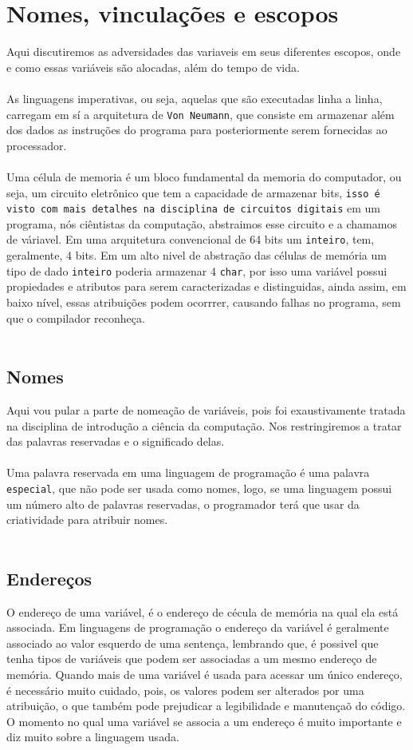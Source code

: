 \documentclass[12pt, onecolumn]{article}
\begin{document}
	\section{Nomes, vinculações e escopos}
	Aqui discutiremos as adversidades das variaveis em seus diferentes escopos, 
	onde e como essas variáveis são alocadas, além do tempo de vida.\\
	\\
	As linguagens imperativas, ou seja, aquelas que são executadas linha a linha,
	carregam em sí a arquitetura de \texttt{Von Neumann}, que consiste em 
	armazenar além dos dados as instruções do programa para posteriormente 
	serem fornecidas ao processador.\\
	\\
	Uma célula de memoria é um bloco fundamental da memoria do computador, ou seja,
	um circuito eletrônico que tem a capacidade de armazenar bits, 
	\texttt{isso é visto com mais detalhes na disciplina de circuitos digitais} em
	um programa, nós ciêntistas da computação, abstraimos esse circuito e a 
	chamamos de váriavel. Em uma arquitetura convencional de 64 bits um 
	\texttt{inteiro}, tem, geralmente, 4 bits. Em um alto nivel de abstração das
	células de memória um tipo de dado \texttt{inteiro} poderia armazenar 4 
	\texttt{char}, por isso uma variável possui propiedades e atributos para
	serem caracterizadas e distinguidas, ainda assim, em baixo nível, essas 
	atribuições podem ocorrrer, causando falhas no programa, sem que o compilador 
	reconheça.\\
	\\

	\subsection{Nomes}
	Aqui vou pular a parte de nomeação de variáveis, pois foi exaustivamente
	tratada na disciplina de introdução a ciência da computação. Nos restringiremos
	a tratar das palavras reservadas e o significado delas.\\
	\\
	Uma palavra reservada em uma linguagem de programação é uma palavra 
	\texttt{especial}, que não pode ser usada como nomes, logo, se uma
	linguagem possui um número alto de palavras reservadas, o programador
	terá que usar da criatividade para atribuir nomes.\\
	\\
	\subsection{Endereços}
	O endereço de uma variável, é o endereço de cécula de memória na qual
	ela está associada. Em linguagens de programação o endereço da variável 
	é geralmente associado ao valor esquerdo de uma sentença, lembrando que, 
	é possivel que tenha tipos de variáveis que podem ser associadas a um mesmo 
	endereço de memória. Quando mais de uma variável é usada para acessar um 
	único endereço,	é necessário muito cuidado, pois, os valores podem ser 
	alterados por uma atribuição, o que também pode prejudicar a legibilidade 
	e manutençaõ do código. O momento no qual uma variável se associa a um
	endereço é muito importante e diz muito sobre a linguagem usada.
	
\end{document}
